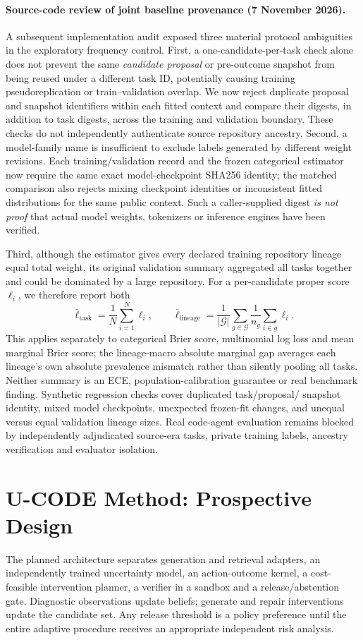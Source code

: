 \documentclass[pdflatex,sn-basic]{sn-jnl}
\begin{document}
\paragraph{Source-code review of joint baseline provenance (7 November 2026).}
A subsequent implementation audit exposed three material protocol
ambiguities in the exploratory frequency control. First, a
one-candidate-per-task check alone does not prevent the same
\emph{candidate proposal} or pre-outcome snapshot from being
reused under a different task ID, potentially causing training
pseudoreplication or train--validation overlap. We now reject
duplicate proposal and snapshot identifiers within each fitted
context and compare their digests, in addition to task digests,
across the training and validation boundary. These checks do not
independently authenticate source repository ancestry.
Second, a model-family name is insufficient to exclude labels
generated by different weight revisions. Each training/validation
record and the frozen categorical estimator now require the
same exact model-checkpoint SHA256 identity; the matched
comparison also rejects mixing checkpoint identities or
inconsistent fitted distributions for the same public context.
Such a caller-supplied digest \emph{is not proof} that actual
model weights, tokenizers or inference engines have been verified.

Third, although the estimator gives every declared training
repository lineage equal total weight, its original validation
summary aggregated all tasks together and could be dominated
by a large repository. For a per-candidate proper score
$\ell_i$, we therefore report both
\[
 \bar\ell_{\mathrm{task}}
 =\frac1N\sum_{i=1}^N\ell_i,\qquad
 \bar\ell_{\mathrm{lineage}}
 =\frac1{|\mathcal G|}
   \sum_{g\in\mathcal G}\frac1{n_g}\sum_{i\in g}\ell_i.
\]
This applies separately to categorical Brier score,
multinomial log loss and mean marginal Brier score;
the lineage-macro absolute marginal gap averages each
lineage's own absolute prevalence mismatch rather than
silently pooling all tasks. Neither summary is an ECE,
population-calibration guarantee or real benchmark finding.
Synthetic regression checks cover duplicated task/proposal/
snapshot identity, mixed model checkpoints, unexpected
frozen-fit changes, and unequal versus equal validation
lineage sizes. Real code-agent evaluation remains blocked
by independently adjudicated source-era tasks, private
training labels, ancestry verification and evaluator isolation.

\section{U-CODE Method: Prospective Design}\label{sec:method}
The planned architecture separates generation and retrieval adapters,
an independently trained uncertainty model, an action-outcome kernel,
a cost-feasible intervention planner, a verifier in a sandbox and a
release/abstention gate. Diagnostic observations update beliefs; generate
and repair interventions update the candidate set. Any release threshold
is a policy preference until the entire adaptive procedure receives an
appropriate independent risk analysis.
\end{document}

